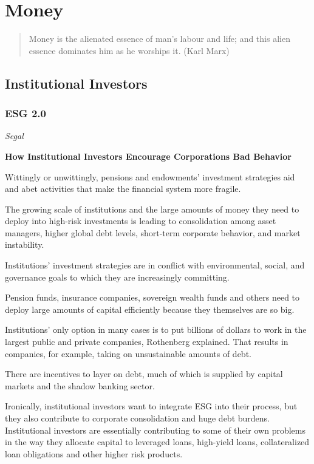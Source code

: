 \documentclass[
]{book}
\begin{document}
\hypertarget{money}{%
\section{Money}\label{money}}

\begin{quote}
Money is the alienated essence of man's labour and life; and this alien essence dominates him as he worships it. (Karl Marx)
\end{quote}

\hypertarget{institutional-investors}{%
\subsection{Institutional Investors}\label{institutional-investors}}

\hypertarget{esg-2.0}{%
\subsubsection{ESG 2.0}\label{esg-2.0}}

\emph{Segal}

\textbf{How Institutional Investors Encourage Corporations Bad Behavior}

Wittingly or unwittingly, pensions and endowments' investment strategies aid and abet activities that make the financial system more fragile.

The growing scale of institutions and the large amounts of money they need to deploy into high-risk investments is leading to consolidation among asset managers, higher global debt levels, short-term corporate behavior, and market instability.

Institutions' investment strategies are in conflict with environmental, social, and governance goals to which they are increasingly committing.

Pension funds, insurance companies, sovereign wealth funds and others need to deploy large amounts of capital efficiently because they themselves are so big.

Institutions' only option in many cases is to put billions of dollars to work in the largest public and private companies, Rothenberg explained. That results in companies, for example, taking on unsustainable amounts of debt.

There are incentives to layer on debt, much of which is supplied by capital markets and the shadow banking sector.

Ironically, institutional investors want to integrate ESG into their process, but they also contribute to corporate consolidation and huge debt burdens. Institutional investors are essentially contributing to some of their own problems in the way they allocate capital to leveraged loans, high-yield loans, collateralized loan obligations
and other higher risk products.
\end{document}

